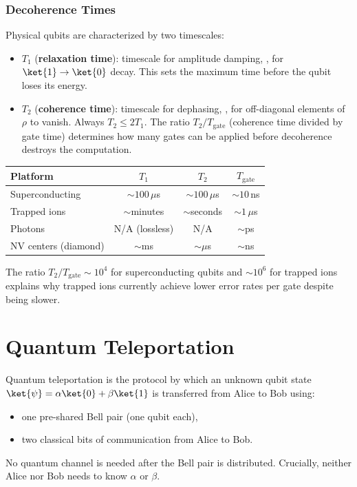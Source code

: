 \documentclass[oneside]{academica}
\begin{document}
\subsection{Decoherence Times}

Physical qubits are characterized by two timescales:
\begin{itemize}
  \item $T_1$ (\textbf{relaxation time}): timescale for amplitude damping, \ie, for $\ket{1}\to\ket{0}$ decay.
    This sets the maximum time before the qubit loses its energy.
  \item $T_2$ (\textbf{coherence time}): timescale for dephasing, \ie, for off-diagonal elements of $\rho$ to vanish.
    Always $T_2\le2T_1$.
    The ratio $T_2/T_{\mathrm{gate}}$ (coherence time divided by gate time) determines how many gates can be applied before decoherence destroys the computation.
\end{itemize}

\begin{center}
  \renewcommand{\arraystretch}{1.3}
  \begin{tabular}{l|c|c|c}
    \textbf{Platform} & $T_1$ & $T_2$ & $T_{\mathrm{gate}}$ \\
    \hline
    Superconducting & $\sim100\,\mu$s & $\sim100\,\mu$s & $\sim10\,$ns \\
    Trapped ions & $\sim$minutes & $\sim$seconds & $\sim1\,\mu$s \\
    Photons & N/A (lossless) & N/A & $\sim$ps \\
    NV centers (diamond) & $\sim$ms & $\sim\mu$s & $\sim$ns \\
  \end{tabular}
\end{center}

The ratio $T_2/T_{\mathrm{gate}}\sim10^4$ for superconducting qubits and $\sim10^6$ for trapped ions explains why trapped ions currently achieve lower error rates per gate despite being slower.

\chapter{Quantum Teleportation}

Quantum teleportation is the protocol by which an unknown qubit state $\ket{\psi}=\alpha\ket{0}+\beta\ket{1}$ is transferred from Alice to Bob using:
\begin{itemize}
  \item one pre-shared Bell pair (one qubit each),
  \item two classical bits of communication from Alice to Bob.
\end{itemize}
No quantum channel is needed after the Bell pair is distributed.
Crucially, neither Alice nor Bob needs to know $\alpha$ or $\beta$.
\end{document}
